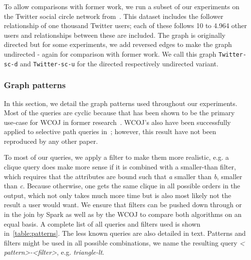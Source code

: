 To allow comparisons with former work, we run a subset of our experiments on the Twitter social circle network from~\cite{snapnets}.
This dataset includes the follower relationship of one thousand Twitter users; each of these follows 10 to 4.964 other users and
relationships between these are included.
The graph is originally directed but for some experiments, we add reversed edges to make the graph undirected - again for comparison with former work.
We call this graph \texttt{Twitter-sc-d} and \texttt{Twitter-sc-u} for the directed respectively undirected variant.

\subsubsection{Graph patterns}

In this section, we detail the graph patterns used throughout our experiments.
Most of the queries are cyclic because that has been shown to be the primary use-case for WCOJ in former research~\cite{olddog,myria-detailed}.
WCOJ's also have been successfully applied to selective path queries in~\cite{olddog}; however, this result have not been reproduced by any
other paper.

To most of our queries, we apply a filter to make them more realistic, e.g. a clique query does make more sense if it is combined with a
smaller-than filter, which requires that the attributes are bound such that \textit{a} smaller than \textit{b}, smaller than \textit{c}.
Because otherwise, one gets the same clique in all possible orders in the output, which not only takes much more time but is also most
likely not the result a user would want.
We ensure that filters can be pushed down through or in the join by Spark as well as by the WCOJ to compare both algorithms on an equal basis.
A complete list of all queries and filters used is shown in~\cref{table:patterns}.
The less known queries are also detailed in text.
Patterns and filters might be used in all possible combinations, we name the resulting query \textit{\textless
pattern\textgreater-\textless filter\textgreater}, e.g. \textit{triangle-lt}.

